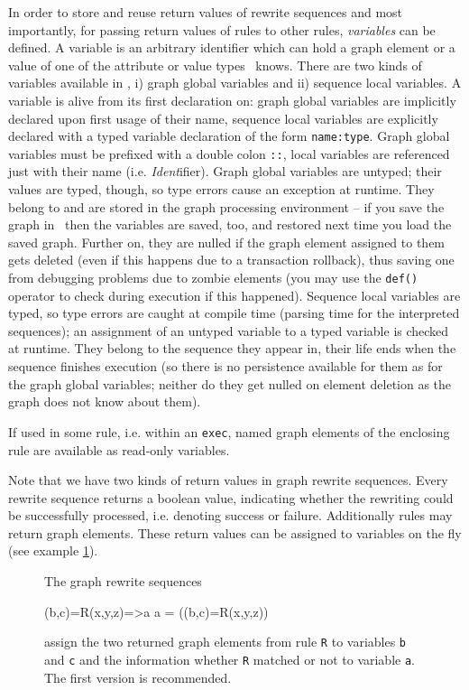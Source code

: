 In order to store and reuse return values of rewrite sequences and most importantly, 
for passing return values of rules to other rules, \emph{variables} can be defined.
A variable is an arbitrary identifier which can hold a graph element or a value of one of the attribute or value types \GrG\ knows.
There are two kinds of variables available in \GrG,
i) graph global variables and 
ii) sequence local variables.
A variable is alive from its first declaration on: graph global variables are implicitly declared upon first usage of their name,
sequence local variables are explicitly declared with a typed variable declaration of the form \texttt{name:type}.
Graph global variables must be prefixed with a double colon \texttt{::}, local variables are referenced just with their name (i.e. \emph{Ident}ifier).
Graph global variables are untyped; their values are typed, though, so type errors cause an exception at runtime.
They belong to and are stored in the graph processing environment -- if you save the graph in \GrShell\ 
then the variables are saved, too, and restored next time you load the saved graph.
Further on, they are nulled if the graph element assigned to them gets deleted (even if this happens due to a transaction rollback),
thus saving one from debugging problems due to zombie elements (you may use the \texttt{def()} operator to check during execution if this happened).
Sequence local variables are typed, so type errors are caught at compile time (parsing time for the interpreted sequences); 
an assignment of an untyped variable to a typed variable is checked at runtime.
They belong to the sequence they appear in, their life ends when the sequence finishes execution 
(so there is no persistence available for them as for the graph global variables; neither do they get nulled on element deletion as the graph does not know about them). 

If used in some rule, i.e. within an \texttt{exec}, named graph elements of the enclosing rule are available as read-only variables.

Note that we have two kinds of return values in graph rewrite sequences.
Every rewrite sequence returns a boolean value, indicating whether the rewriting could be successfully processed, i.e. denoting success or failure.
Additionally rules may return graph elements.
These return values can be assigned to variables on the fly (see example \ref{ex:grsreturn}).
\begin{figure}[htbp]
\begin{example}
	\label{ex:grsreturn}
The graph rewrite sequences
	\begin{grgen}	 
(b,c)=R(x,y,z)=>a
a = ((b,c)=R(x,y,z))
	\end{grgen}
assign the two returned graph elements from rule \texttt{R} to variables \texttt{b} and \texttt{c} and the information whether \texttt{R} matched or not to variable \texttt{a}. The first version is recommended.
\end{example}
\end{figure}


